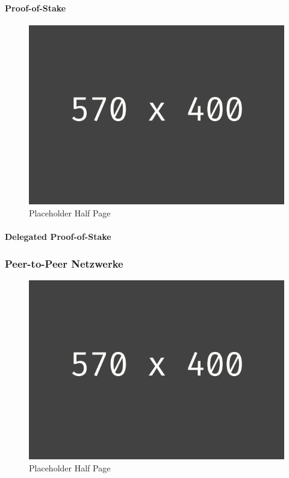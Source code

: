 \paragraph{Proof-of-Stake}
\begin{figure}[h!]
	\centering
	\includegraphics[width=1.0\linewidth]{pictures/placeholder_half_page}
	\caption[Placeholder Half Page]{Placeholder Half Page}
	\label{fig:placeholder_half_page}
\end{figure}


\paragraph{Delegated Proof-of-Stake}


\subsubsection{Peer-to-Peer Netzwerke}
\begin{figure}[h!]
	\centering
	\includegraphics[width=1.0\linewidth]{pictures/placeholder_half_page}
	\caption[Placeholder Half Page]{Placeholder Half Page}
	\label{fig:placeholder_half_page}
\end{figure}


